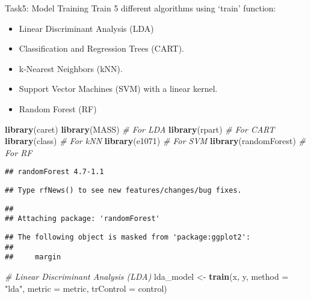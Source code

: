 \documentclass[
]{article}
\newenvironment{Shaded}{\begin{snugshade}}{\end{snugshade}}
\newcommand{\AttributeTok}[1]{\textcolor[rgb]{0.13,0.29,0.53}{#1}}
\newcommand{\CommentTok}[1]{\textcolor[rgb]{0.56,0.35,0.01}{\textit{#1}}}
\newcommand{\FunctionTok}[1]{\textcolor[rgb]{0.13,0.29,0.53}{\textbf{#1}}}
\newcommand{\NormalTok}[1]{#1}
\newcommand{\OtherTok}[1]{\textcolor[rgb]{0.56,0.35,0.01}{#1}}
\newcommand{\StringTok}[1]{\textcolor[rgb]{0.31,0.60,0.02}{#1}}
\providecommand{\tightlist}{%
  \setlength{\itemsep}{0pt}\setlength{\parskip}{0pt}}
\begin{document}
Task5: Model Training Train 5 different algorithms using `train'
function:

\begin{itemize}
\tightlist
\item
  Linear Discriminant Analysis (LDA)
\item
  Classification and Regression Trees (CART).
\item
  k-Nearest Neighbors (kNN).
\item
  Support Vector Machines (SVM) with a linear kernel.
\item
  Random Forest (RF)
\end{itemize}

\begin{Shaded}
\begin{Highlighting}[]
\FunctionTok{library}\NormalTok{(caret)}
\FunctionTok{library}\NormalTok{(MASS)          }\CommentTok{\# For LDA}
\FunctionTok{library}\NormalTok{(rpart)         }\CommentTok{\# For CART}
\FunctionTok{library}\NormalTok{(class)         }\CommentTok{\# For kNN}
\FunctionTok{library}\NormalTok{(e1071)         }\CommentTok{\# For SVM}
\FunctionTok{library}\NormalTok{(randomForest)  }\CommentTok{\# For RF}
\end{Highlighting}
\end{Shaded}

\begin{verbatim}
## randomForest 4.7-1.1
\end{verbatim}

\begin{verbatim}
## Type rfNews() to see new features/changes/bug fixes.
\end{verbatim}

\begin{verbatim}
## 
## Attaching package: 'randomForest'
\end{verbatim}

\begin{verbatim}
## The following object is masked from 'package:ggplot2':
## 
##     margin
\end{verbatim}

\begin{Shaded}
\begin{Highlighting}[]
\CommentTok{\# Linear Discriminant Analysis (LDA)}
\NormalTok{lda\_model }\OtherTok{\textless{}{-}} \FunctionTok{train}\NormalTok{(x, y, }\AttributeTok{method =} \StringTok{"lda"}\NormalTok{, }\AttributeTok{metric =}\NormalTok{ metric, }\AttributeTok{trControl =}\NormalTok{ control)}
\end{Highlighting}
\end{Shaded}
\end{document}
